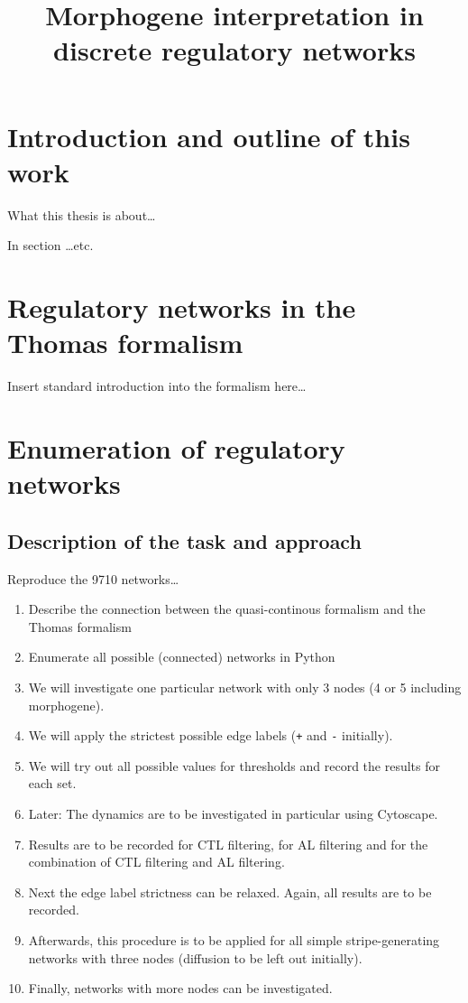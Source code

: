 \documentclass{article}
\begin{document}
\title{Morphogene interpretation in discrete regulatory networks}
\maketitle

\begin{flushleft}

\section{Introduction and outline of this work}

What this thesis is about\ldots

In section \ldots etc.

\section{Regulatory networks in the Thomas formalism}

Insert standard introduction into the formalism here\ldots

\section{Enumeration of regulatory networks}

\subsection{Description of the task and approach}

Reproduce the 9710 networks\ldots

\begin{enumerate}
  \item Describe the connection between the quasi-continous formalism and the
  Thomas formalism
  \item Enumerate all possible (connected) networks in Python
  \item We will investigate one particular network with only 3 nodes (4 or 5
  including morphogene).
  \item We will apply the strictest possible edge labels ({\tt +} and {\tt -}
  initially).
  \item We will try out all possible values for thresholds and record the
  results for each set.
  \item Later: The dynamics are to be investigated in particular using
  Cytoscape.
  \item Results are to be recorded for CTL filtering, for AL filtering and for
  the combination of CTL filtering and AL filtering.
  \item Next the edge label strictness can be relaxed. Again, all results are to
  be recorded.
  \item Afterwards, this procedure is to be applied for all simple
  stripe-generating networks with three nodes (diffusion to be left out initially).
  \item Finally, networks with more nodes can be investigated.
\end{enumerate}


\end{flushleft}
\end{document}

